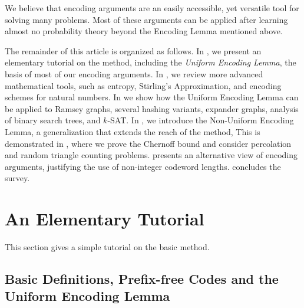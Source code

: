 \documentclass[format=acmsmall, review=false, screen=true]{acmart}
\begin{document}
We believe that encoding arguments are an easily
accessible, yet versatile tool for solving many problems.  Most of
these arguments can be applied after learning almost no probability
theory beyond the Encoding Lemma mentioned above.

The remainder of this article is organized as follows. In
, we present an elementary tutorial on the
method, including the
\emph{Uniform Encoding Lemma}, the basis of most of our
encoding arguments. In , we review 
more advanced mathematical tools, such as entropy,
Stirling's Approximation, and encoding schemes for natural
numbers. In  we show how the Uniform
Encoding Lemma can be applied to
Ramsey graphs, several hashing variants, expander graphs,
analysis of binary search trees, and $k$-SAT. In
, we introduce the Non-Uniform Encoding Lemma,
a generalization
that extends the reach of the method, This is demonstrated in
, where we prove the Chernoff 
bound and consider percolation and random triangle counting problems.
 presents an
alternative view of encoding arguments, justifying the use of
non-integer codeword lengths.   concludes the
survey.

\section{An Elementary Tutorial}

This section gives a simple tutorial on the basic
method.

\subsection{Basic Definitions, Prefix-free Codes and the Uniform 
Encoding Lemma}
\end{document}
